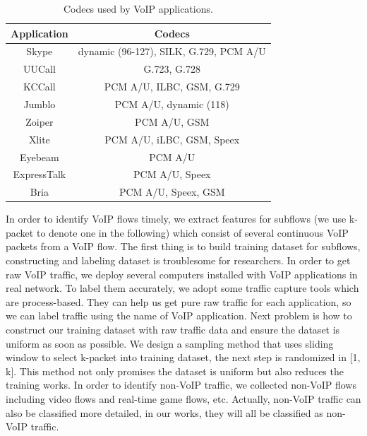 \documentclass[conference]{IEEEtran}
\begin{document}
\begin{table}[htbp]
  \caption{Codecs used by VoIP applications.}
  \label{tab:codecs}
  \centering
  \begin{tabular}{c c}
    \hline
    \textbf{Application} & \textbf{Codecs}\\
    \hline
    Skype      & dynamic (96-127), SILK, G.729, PCM A/U  \\
    UUCall      & G.723, G.728  \\
    KCCall      & PCM A/U, ILBC, GSM, G.729  \\
    Jumblo      & PCM A/U, dynamic (118)  \\
    Zoiper      & PCM A/U, GSM  \\
    Xlite      &  PCM A/U, iLBC, GSM, Speex \\
    Eyebeam      & PCM A/U  \\
    ExpressTalk      & PCM A/U, Speex  \\
    Bria      & PCM A/U, Speex, GSM  \\
    \hline
  \end{tabular}
\end{table}

In order to identify VoIP flows timely, we extract features for subflows (we use k-packet to denote one in the following) which consist of several continuous VoIP packets from a VoIP flow. The first thing is to build training dataset for subflows, constructing and labeling dataset is troublesome for researchers. In order to get raw VoIP traffic, we deploy several computers installed with VoIP applications in real network. To label them accurately, we adopt some traffic capture tools which are process-based. They can help us get pure raw traffic for each application, so we can label traffic using the name of VoIP application. Next problem is how to construct our training dataset with raw traffic data and ensure the dataset is uniform as soon as possible. We design a sampling method that uses sliding window to select k-packet into training dataset, the next step is randomized in [1, k]. This method not only promises the dataset is uniform but also reduces the training works. In order to identify non-VoIP traffic, we collected non-VoIP flows including video flows and real-time game flows, etc. Actually, non-VoIP traffic can also be classified more detailed, in our works, they will all be classified as non-VoIP traffic.
\end{document}
